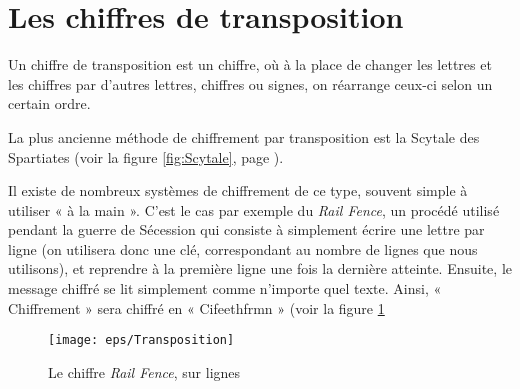 \section{Les chiffres de transposition}
Un chiffre de transposition est un chiffre, où à la place de changer
les lettres et les chiffres par d'autres lettres, chiffres ou signes,
on réarrange ceux-ci selon un certain ordre.

La plus ancienne méthode de chiffrement par transposition est la
Scytale des Spartiates (voir la figure \ref{fig:Scytale}, page
\pageref{fig:Scytale}).

Il existe de nombreux systèmes de chiffrement de ce type, souvent
simple à utiliser « à la main ». C'est le cas par exemple du
\emph{Rail Fence}, un procédé utilisé pendant la guerre de Sécession
qui consiste à simplement écrire une lettre par ligne (on utilisera donc
une clé, correspondant au nombre de lignes que nous utilisons), et
reprendre à la première ligne une fois la dernière atteinte. Ensuite,
le message chiffré se lit simplement comme n'importe quel texte.
Ainsi, « Chiffrement » sera chiffré en « Cifeethfrmn » (voir la figure \ref{fig:Transposition}
\begin{figure}[h]
  \begin{center}
    \texttt{[image: eps/Transposition]}
  \end{center}
  \caption{Le chiffre \emph{Rail Fence}, sur lignes}
  \label{fig:Transposition}
\end{figure}

